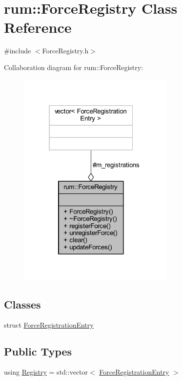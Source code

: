 \hypertarget{classrum_1_1_force_registry}{}\section{rum\+:\+:Force\+Registry Class Reference}
\label{classrum_1_1_force_registry}


{\ttfamily \#include $<$Force\+Registry.\+h$>$}



Collaboration diagram for rum\+:\+:Force\+Registry\+:\nopagebreak
\begin{figure}[H]
\begin{center}
\leavevmode
\includegraphics[width=220pt]{classrum_1_1_force_registry__coll__graph}
\end{center}
\end{figure}
\subsection*{Classes}
\begin{DoxyCompactItemize}
\item 
struct \mbox{\hyperlink{structrum_1_1_force_registry_1_1_force_registration_entry}{Force\+Registration\+Entry}}
\end{DoxyCompactItemize}
\subsection*{Public Types}
\begin{DoxyCompactItemize}
\item 
using \mbox{\hyperlink{classrum_1_1_force_registry_a4a52c8f9558a80eea2e47e328b687c77}{Registry}} = std\+::vector$<$ \mbox{\hyperlink{structrum_1_1_force_registry_1_1_force_registration_entry}{Force\+Registration\+Entry}} $>$
\end{DoxyCompactItemize}
